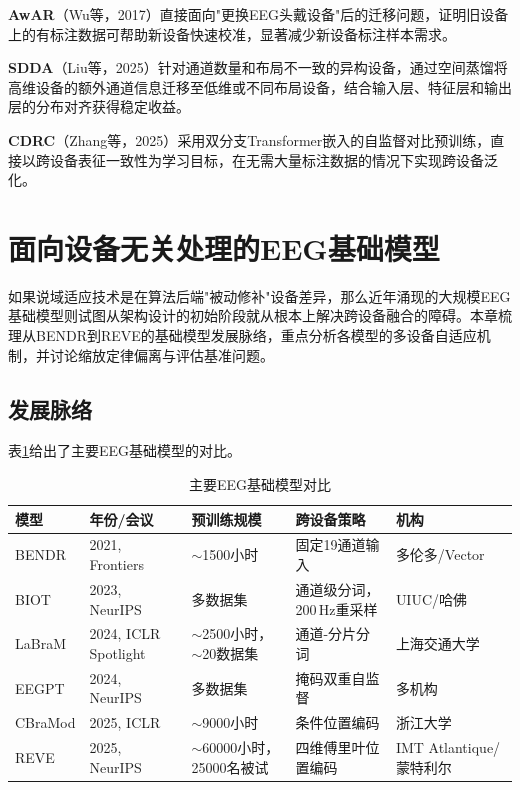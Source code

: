 \documentclass[12pt, a4paper]{article}
\begin{document}
\textbf{AwAR}（Wu等，2017）\citep{Wu2017AwAR}直接面向"更换EEG头戴设备"后的迁移问题，证明旧设备上的有标注数据可帮助新设备快速校准，显著减少新设备标注样本需求。

\textbf{SDDA}（Liu等，2025）\citep{Liu2025SDDA}针对通道数量和布局不一致的异构设备，通过空间蒸馏将高维设备的额外通道信息迁移至低维或不同布局设备，结合输入层、特征层和输出层的分布对齐获得稳定收益。

\textbf{CDRC}（Zhang等，2025）\citep{Zhang2025CDRC}采用双分支Transformer嵌入的自监督对比预训练，直接以跨设备表征一致性为学习目标，在无需大量标注数据的情况下实现跨设备泛化。

\section{面向设备无关处理的EEG基础模型}
\label{sec:foundation}

如果说域适应技术是在算法后端"被动修补"设备差异，那么近年涌现的大规模EEG基础模型则试图从架构设计的初始阶段就从根本上解决跨设备融合的障碍。本章梳理从BENDR到REVE的基础模型发展脉络，重点分析各模型的多设备自适应机制，并讨论缩放定律偏离与评估基准问题。

\subsection{发展脉络}

表\ref{tab:foundation}给出了主要EEG基础模型的对比。

\begin{table}[H]
\centering
\caption{主要EEG基础模型对比}
\label{tab:foundation}
\small
\begin{tabularx}{\textwidth}{lllXX}
\toprule
\textbf{模型} & \textbf{年份/会议} & \textbf{预训练规模} & \textbf{跨设备策略} & \textbf{机构} \\
\midrule
BENDR \citep{Kostas2021BENDR} & 2021, Frontiers & $\sim$1500小时 & 固定19通道输入 & 多伦多/Vector \\
\addlinespace
BIOT \citep{Yang2023BIOT} & 2023, NeurIPS & 多数据集 & 通道级分词，200\,Hz重采样 & UIUC/哈佛 \\
\addlinespace
LaBraM \citep{Jiang2024LaBraM} & 2024, ICLR Spotlight & $\sim$2500小时，$\sim$20数据集 & 通道-分片分词 & 上海交通大学 \\
\addlinespace
EEGPT \citep{EEGPT2024} & 2024, NeurIPS & 多数据集 & 掩码双重自监督 & 多机构 \\
\addlinespace
CBraMod \citep{Wang2025CBraMod} & 2025, ICLR & $\sim$9000小时 & 条件位置编码 & 浙江大学 \\
\addlinespace
REVE \citep{ElOuahidi2025REVE} & 2025, NeurIPS & $\sim$60000小时，25000名被试 & 四维傅里叶位置编码 & IMT Atlantique/蒙特利尔 \\
\bottomrule
\end{tabularx}
\end{table}
\end{document}
